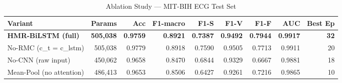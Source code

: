 \begin{table}[h]
\centering
\caption{Ablation Study --- MIT-BIH ECG Test Set}
\label{tab:ablation}
\begin{tabular}{lrrrrrrrr}
\toprule
Variant & Params & Acc & F1-macro & F1-S & F1-V & F1-F & AUC & Best Ep \\
\midrule
\textbf{HMR-BiLSTM (full)} & \textbf{505,038} & \textbf{0.9759} & \textbf{0.8921} & \textbf{0.7387} & \textbf{0.9492} & \textbf{0.7944} & \textbf{0.9917} & \textbf{32} \\
No-RMC (c_t = c_lstm) & 505,038 & 0.9779 & 0.8918 & 0.7590 & 0.9505 & 0.7713 & 0.9911 & 20 \\
No-CNN (raw input) & 450,062 & 0.9658 & 0.8470 & 0.6844 & 0.9329 & 0.6667 & 0.9881 & 18 \\
Mean-Pool (no attention) & 486,413 & 0.9653 & 0.8506 & 0.6427 & 0.9261 & 0.7216 & 0.9865 & 10 \\
\bottomrule
\end{tabular}
\end{table}
